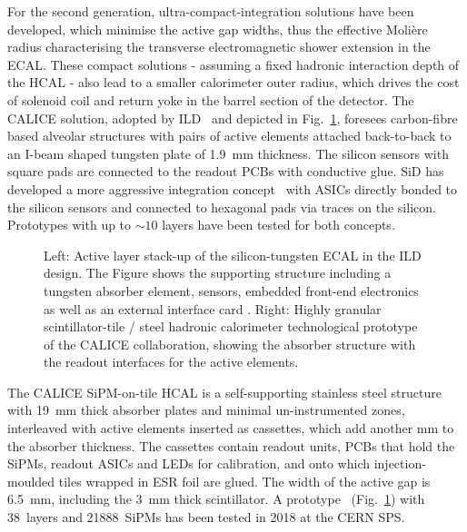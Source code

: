 For the second generation, ultra-compact-integration solutions have been developed, which minimise the active gap widths, thus the effective Moli\`ere radius characterising the  transverse electromagnetic shower extension in the ECAL. These compact solutions - assuming a fixed hadronic interaction depth of the HCAL - also lead to a smaller calorimeter outer radius, which drives the cost of solenoid coil and return yoke in the barrel section of the detector.
The CALICE solution, adopted by ILD~\cite{ILD:2020qve} and depicted in Fig.~\ref{fig:hg-ecal-ahcal}, foresees carbon-fibre based alveolar structures with pairs of active elements attached back-to-back to an I-beam shaped tungsten plate of 1.9~mm thickness.
The silicon sensors with square pads are connected to the readout PCBs with conductive glue. 
SiD has developed a more aggressive integration concept~\cite{Barkeloo:2019zow} with ASICs directly bonded to the silicon sensors and connected to hexagonal pads via traces on the silicon.
Prototypes with up to $\sim 10$ layers have been tested for both concepts.
\begin{figure}
    \centering
    \caption{Left: Active layer stack-up of the silicon-tungsten ECAL in the ILD design. The Figure shows the supporting structure including a tungsten absorber element, sensors, embedded front-end electronics as well as an external interface card \cite{Brient:2018ydi}.
    Right: Highly granular scintillator-tile / steel hadronic calorimeter technological prototype of the CALICE collaboration, showing %
    the absorber structure with the readout interfaces for the active elements.
    }
    \label{fig:hg-ecal-ahcal}
\end{figure}

The CALICE SiPM-on-tile HCAL is a self-supporting stainless steel structure with 19~mm thick absorber plates and minimal un-instrumented zones, interleaved with active elements inserted as cassettes, which add another mm to the absorber thickness. The cassettes contain readout units, PCBs that hold the SiPMs, readout ASICs and LEDs for calibration, and onto which injection-moulded tiles wrapped in ESR foil are glued. 
The width of the active gap is 6.5~mm, including the 3~mm thick scintillator. 
A prototype~\cite{Sefkow:2018rhp} (Fig.~\ref{fig:hg-ecal-ahcal}) with 38~layers and 21888~SiPMs has been tested in 2018 at the CERN SPS. 

